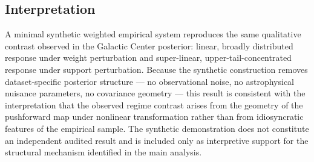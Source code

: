 \documentclass[a4paper,fleqn,usenatbib]{mnras}
\begin{document}
\subsection{Interpretation}

A minimal synthetic weighted empirical system reproduces the same qualitative
contrast observed in the Galactic Center posterior: linear, broadly distributed
response under weight perturbation and super-linear, upper-tail-concentrated
response under support perturbation. Because the synthetic construction removes
dataset-specific posterior structure --- no observational noise, no astrophysical
nuisance parameters, no covariance geometry --- this result is consistent with
the interpretation that the observed regime contrast arises from the geometry of
the pushforward map under nonlinear transformation rather than from idiosyncratic
features of the empirical sample. The synthetic demonstration does not constitute
an independent audited result and is included only as interpretive support for
the structural mechanism identified in the main analysis.

\label{lastpage}
\end{document}
